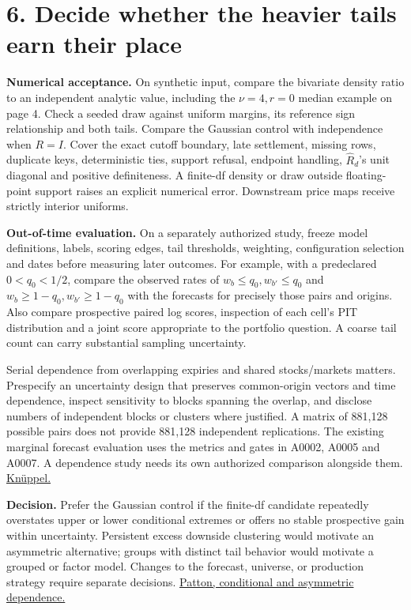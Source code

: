 \documentclass[11pt,letterpaper]{article}
\newcommand{\sect}[1]{\section*{\color{ink}#1}}
\newcommand{\lead}[1]{\textbf{\textcolor{accent}{#1}}}
\newcommand{\src}[2]{\href{#1}{#2}}
\begin{document}
\newpage
\sect{6. Decide whether the heavier tails earn their place}
\lead{Numerical acceptance.} On synthetic input, compare the bivariate density ratio to an independent analytic value, including the \(\nu=4,r=0\) median example on page 4. Check a seeded draw against uniform margins, its reference sign relationship and both tails. Compare the Gaussian control with independence when \(R=I\). Cover the exact cutoff boundary, late settlement, missing rows, duplicate keys, deterministic ties, support refusal, endpoint handling, \(\widehat R_d\)'s unit diagonal and positive definiteness. A finite-df density or draw outside floating-point support raises an explicit numerical error. Downstream price maps receive strictly interior uniforms.

\lead{Out-of-time evaluation.} On a separately authorized study, freeze model definitions, labels, scoring edges, tail thresholds, weighting, configuration selection and dates before measuring later outcomes. For example, with a predeclared \(0<q_0<1/2\), compare the observed rates of \(w_b\le q_0,w_{b'}\le q_0\) and \(w_b\ge1-q_0,w_{b'}\ge1-q_0\) with the forecasts for precisely those pairs and origins. Also compare prospective paired log scores, inspection of each cell's PIT distribution and a joint score appropriate to the portfolio question. A coarse tail count can carry substantial sampling uncertainty.

Serial dependence from overlapping expiries and shared stocks/markets matters. Prespecify an uncertainty design that preserves common-origin vectors and time dependence, inspect sensitivity to blocks spanning the overlap, and disclose numbers of independent blocks or clusters where justified. A matrix of 881,128 possible pairs does not provide 881,128 independent replications. The existing marginal forecast evaluation uses the metrics and gates in A0002, A0005 and A0007. A dependence study needs its own authorized comparison alongside them. \src{https://www.bundesbank.de/resource/blob/635436/766e285ef812d86d49c02dd8033d7333/472B63F073F071307366337C94F8C870/2012-06-01-eltville-02-knueppel-paper-data.pdf}{Kn\"uppel.}

\lead{Decision.} Prefer the Gaussian control if the finite-df candidate repeatedly overstates upper or lower conditional extremes or offers no stable prospective gain within uncertainty. Persistent excess downside clustering would motivate an asymmetric alternative; groups with distinct tail behavior would motivate a grouped or factor model. Changes to the forecast, universe, or production strategy require separate decisions. \src{https://public.econ.duke.edu/~ap172/Patton_IER_2006.pdf}{Patton, conditional and asymmetric dependence.}
\end{document}
